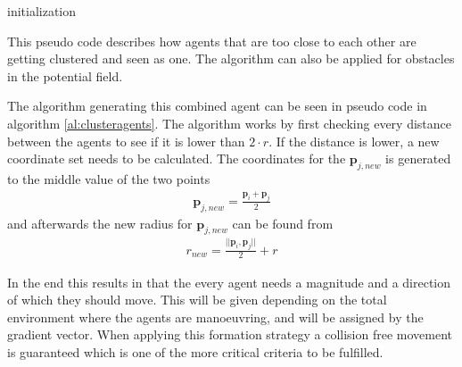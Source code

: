 \documentclass[a4paper,conference]{IEEEtran}
\begin{document}
\begin{algorithm}[h]
  initialization\;
	\caption{This pseudo code describes how agents that are too close to
		each other are getting clustered and seen as one. The algorithm
		can also be applied for obstacles in the potential
		field.}
  \label{al:clusteragents}
\end{algorithm}

The algorithm generating this combined agent can be seen in pseudo
code in algorithm \ref{al:clusteragents}.
The algorithm works by first checking every distance between the agents to see if it is lower
than $2 \cdot r$. If the distance is lower, a new coordinate set needs
to be calculated. The coordinates for the $\mathbf{p}_{j,new}$ is
generated to the middle value of the two points
\begin{align}
\mathbf{p}_{j,new} = \frac{\mathbf{p}_i + \mathbf{p}_j}{2}
\end{align}
and afterwards the new radius for $\mathbf{p}_{j,new}$ can be found from
\begin{align}
r_{new} = \frac{||\mathbf{p}_i , \mathbf{p}_j||}{2} + r
\end{align}

In the end this results in that the every agent needs a magnitude and
a direction of which they should move. This will be given depending on
the total environment where the agents are manoeuvring, and will be
assigned by the gradient vector. When applying this formation strategy
a collision free movement is guaranteed which is one of the more
critical criteria to be fulfilled. 
\end{document}
